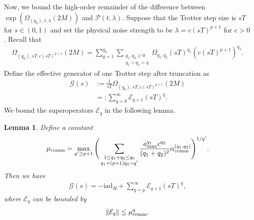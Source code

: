 \documentclass[11pt]{article}
\newtheorem{lemma}{Lemma}
\renewcommand{\i}{\mathrm{i}}
\newcommand{\ad}{\mathrm{ad}}
\newcommand{\G}{\mathcal{G}}
\newcommand{\E}{\mathcal{E}}
\newcommand{\mc}{\mathcal}
\begin{document}
Now, we bound the high-order remainder of the difference between $\exp(\Omega_{(q_0), t,\lambda}(2M))$ and ${\mc P}(t,\lambda)$.
Suppose that the Trotter step size is $sT$ for $s\in (0,1)$ and set the physical noise strength to be $\lambda = c(sT)^{p+1}$ for $c > 0$.  Recall that \begin{align*}
    \Omega_{(q_0), sT,c(sT)^{p+1}}(2M)=\sum_{q = 1}^{q_0}\sum_{\substack{q_1,q_2\ge 0\\ q_1+q_2 = q}} \Omega_{q_1, q_2} (sT)^{q_1}(c(sT)^{p+1})^{q_2}.
\end{align*}Define the effective generator of one Trotter step after truncation as \begin{align}
\label{eq:def-effect-generator}
    \G(s)&:= \frac{1}{sT}\Omega_{(q_0), sT,c(sT)^{p+1}}(2M)\\
    &=:\sum_{q=0}^{\infty} \E_{q+1} (sT)^q. 
\end{align}
We bound the superoperators $\E_{q}$ in the following lemma. 
\begin{lemma}
    \label{lem:bound-E}
    Define a constant
    \begin{align}\label{eq:def-mu}
        \mu_{\rm comm} = \max_{q' \ge p+1} \Bigg(\sum_{\substack{1\le q_1+ q_2\le q_0 \\
        q_1+(p+1)q_2 = q'}}\frac{a_{\max}^{q_1}c^{q_2}}{(q_1+q_2)^2} \alpha_{\rm comm}^{(q_1, q_2)}\Bigg)^{1/q'}.
    \end{align}
    Then we have \begin{align}
        \G(s) = -\i \ad_H + \sum_{q=p}^{\infty} \E_{q+1} (sT)^q \label{eq:def-E},
    \end{align} where $\E_{q}$ can be bounded by \begin{align}
        \|\E_q\| \le  \mu_{\rm comm}^q.
    \end{align}
\end{lemma}
\end{document}
